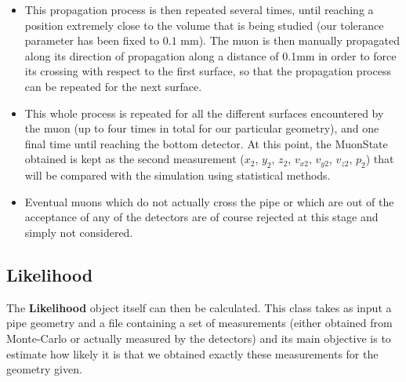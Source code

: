 \documentclass[a4paper, 11pt, twoside, openright]{report}
\begin{document}
\begin{itemize}
\item This propagation process is then repeated several times, until reaching a position extremely close to the volume that is being studied (our tolerance parameter has been fixed to $0.1$ mm). The muon is then manually propagated along its direction of propagation along a distance of 0.1mm in order to force its crossing with respect to the first surface, so that the propagation process can be repeated for the next surface.
\item This whole process is repeated for all the different surfaces encountered by the muon (up to four times in total for our particular geometry), and one final time until reaching the bottom detector. At this point, the MuonState obtained is kept as the second measurement ($x_2$, $y_2$, $z_2$, $v_{x2}$, $v_{y2}$, $v_{z2}$, $p_2$) that will be compared with the simulation using statistical methods.
\item Eventual muons which do not actually cross the pipe or which are out of the acceptance of any of the detectors are of course rejected at this stage and simply not considered.
\end{itemize}

\subsection{Likelihood}

The \textbf{Likelihood} object itself can then be calculated. This class takes as input a pipe geometry and a file containing a set of measurements (either obtained from Monte-Carlo or actually measured by the detectors) and its main objective is to estimate how likely it is that we obtained exactly these measurements for the geometry given. 
\end{document}

